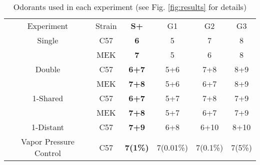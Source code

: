 \label{tab:design}
\begin{table}
    \begin{tabular}{ c c c c c c }
        Experiment & Strain & \textbf{S+} & G1 & G2 & G3 &\\ 
        Single & C57 & \textbf{6} & 5 & 7 & 8 &   \\ 
         & MEK & \textbf{7} & 5 & 6 & 8 &  \\ 
        Double & C57 & \textbf{6+7} & 5+6 & 7+8 & 8+9 &    \\ 
         & MEK & \textbf{7+8} & 5+6 & 6+7 & 8+9 &   \\ 
        1-Shared & C57 & \textbf{6+7} & 5+7 & 7+8 & 7+9 &  \\ 
         & MEK & \textbf{7+8} & 5+7 & 6+7 & 7+9 &   \\ 
        1-Distant & C57 & \textbf{7+9} & 6+8 & 6+10 & 8+10 &    \\ 
        Vapor Pressure Control & C57 & \textbf{7(1\%)} & 7(0.01\%) & 7(0.1\%) & 7(5\%) &   \\ 
    \end{tabular}
    \caption{Odorants used in each experiment (see Fig. \ref{fig:results} for details)}
\end{table}